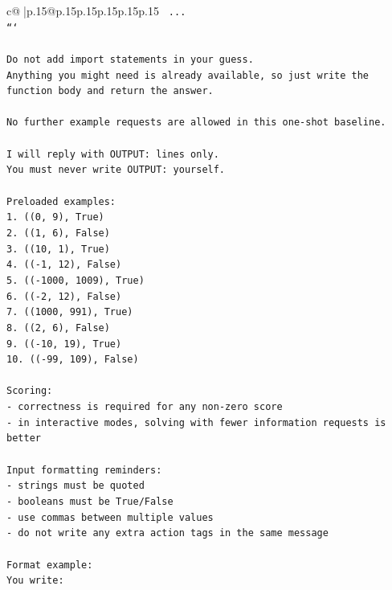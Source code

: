 \documentclass{article}
\begin{document}
{\begin{supertabular}{c@{$\;$}|p{.15\linewidth}@{}p{.15\linewidth}p{.15\linewidth}p{.15\linewidth}p{.15\linewidth}p{.15\linewidth}}
{{{\texttt{    ...} \\
\texttt{```} \\
\\ 
\texttt{Do not add import statements in your guess.} \\
\texttt{Anything you might need is already available, so just write the function body and return the answer.} \\
\\ 
\texttt{No further example requests are allowed in this one{-}shot baseline.} \\
\\ 
\texttt{I will reply with OUTPUT: lines only.} \\
\texttt{You must never write OUTPUT: yourself.} \\
\\ 
\texttt{Preloaded examples:} \\
\texttt{1. ((0, 9), True)} \\
\texttt{2. ((1, 6), False)} \\
\texttt{3. ((10, 1), True)} \\
\texttt{4. (({-}1, 12), False)} \\
\texttt{5. (({-}1000, 1009), True)} \\
\texttt{6. (({-}2, 12), False)} \\
\texttt{7. ((1000, 991), True)} \\
\texttt{8. ((2, 6), False)} \\
\texttt{9. (({-}10, 19), True)} \\
\texttt{10. (({-}99, 109), False)} \\
\\ 
\texttt{Scoring:} \\
\texttt{{-} correctness is required for any non{-}zero score} \\
\texttt{{-} in interactive modes, solving with fewer information requests is better} \\
\\ 
\texttt{Input formatting reminders:} \\
\texttt{{-} strings must be quoted} \\
\texttt{{-} booleans must be True/False} \\
\texttt{{-} use commas between multiple values} \\
\texttt{{-} do not write any extra action tags in the same message} \\
\\ 
\texttt{Format example:} \\
\texttt{You write:} \\
}}}
\end{supertabular}}
\end{document}
